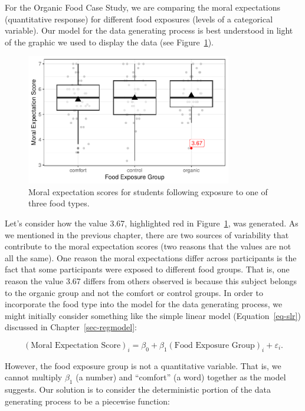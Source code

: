 \documentclass[
  letterpaper,
  DIV=11,
  numbers=noendperiod]{scrreprt}
\theoremstyle{plain}
\theoremstyle{definition}
\theoremstyle{definition}
\theoremstyle{remark}
\begin{document}
For the Organic Food Case Study, we are comparing the moral expectations
(quantitative response) for different food exposures (levels of a
categorical variable). Our model for the data generating process is best
understood in light of the graphic we used to display the data (see
Figure~\ref{fig-anovamodel-organic-plot}).

\begin{figure}

{\centering \includegraphics[width=0.8\textwidth,height=\textheight]{./images/fig-anovamodel-organic-plot-1.pdf}

}

\caption{\label{fig-anovamodel-organic-plot}Moral expectation scores for
students following exposure to one of three food types.}

\end{figure}

Let's consider how the value 3.67, highlighted red in
Figure~\ref{fig-anovamodel-organic-plot}, was generated. As we mentioned
in the previous chapter, there are two sources of variability that
contribute to the moral expectation scores (two reasons that the values
are not all the same). One reason the moral expectations differ across
participants is the fact that some participants were exposed to
different food groups. That is, one reason the value 3.67 differs from
others observed is because this subject belongs to the organic group and
not the comfort or control groups. In order to incorporate the food type
into the model for the data generating process, we might initially
consider something like the simple linear model (Equation~\ref{eq-slr})
discussed in Chapter~\ref{sec-regmodel}:

\[(\text{Moral Expectation Score})_i = \beta_0 + \beta_1 (\text{Food Exposure Group})_i + \varepsilon_i.\]

However, the food exposure group is not a quantitative variable. That
is, we cannot multiply \(\beta_1\) (a number) and ``comfort'' (a word)
together as the model suggests. Our solution is to consider the
deterministic portion of the data generating process to be a piecewise
function:
\end{document}
